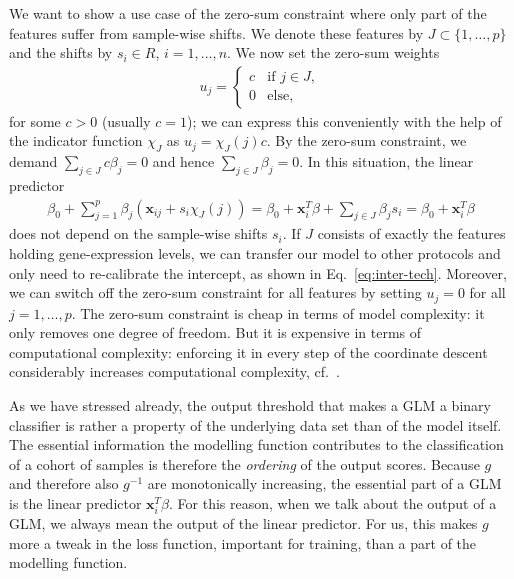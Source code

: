 We want to show a use case of the zero-sum constraint where only part of the features suffer from 
sample-wise shifts. We denote these features by $J \subset \{1, \ldots, p\}$ and the shifts by 
$s_i \in R$, $i = 1, \ldots, n$. We now set the zero-sum 
weights  
\begin{align}
    u_j =
    \begin{cases}
        c & \text{if } j \in J, \\
        0 & \text{else},
    \end{cases}
\end{align}
for some $c > 0$ (usually $c = 1$); we can express this conveniently with the help of the indicator 
function $\chi_J$ as $u_j = \chi_J(j) c$. By the zero-sum constraint, we demand 
$\sum_{j \in J} c \beta_j = 0$  
and hence $\sum_{j \in J} \beta_j = 0$.  In this situation, the linear predictor 
\begin{align}\label{eq:zerosum-sample-shifts}
    \beta_0 + \sum_{j=1}^p \beta_j (\mathbf{x}_{ij} + s_i \chi_J(j))
    = \beta_0 + \mathbf{x}_i^T \beta + \sum_{j \in J} \beta_j s_i = \beta_0 + \mathbf{x}_i^T \beta
\end{align}
does not depend on the sample-wise shifts $s_i$. If $J$ consists of 
exactly the features holding gene-expression levels, we can transfer our model to other protocols 
and only need to re-calibrate the intercept, as shown in Eq.\ \eqref{eq:inter-tech}. Moreover, we 
can switch off the zero-sum constraint for all features by setting $u_j = 0$ for all 
$j = 1, \ldots, p$. The zero-sum constraint is cheap in terms of model complexity: it only removes 
one degree of freedom. But it is expensive in terms of computational complexity: enforcing it in
every step of the coordinate descent considerably increases computational complexity, cf.\
\cite{zerosum16}.

As we have stressed already, the output threshold that makes a GLM a binary classifier 
is rather a property of the underlying data set than of the model itself. The essential information 
the modelling function contributes to the classification of a cohort of samples is therefore the 
\textit{ordering} of the output scores. Because $g$ and therefore also $g^{-1}$ are monotonically increasing, 
the essential part of a GLM is the linear predictor $\mathbf{x}_i^T \beta$. For this reason, when we 
talk about the output of a GLM, we always mean the output of the linear predictor. For us, this 
makes $g$ more a tweak in the loss function, important for training, than a part of the modelling 
function.

